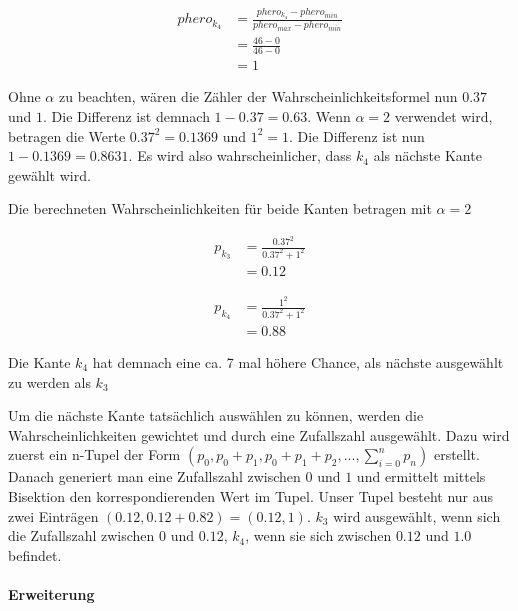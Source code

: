 \begin{equation*}
\begin{split}
phero_{k_4} & = \frac{phero_{k_4} - phero_{min}}{phero_{max} - phero_{min}} \\
            & = \frac{46 - 0}{46 - 0} \\
            & = 1
\end{split}
\end{equation*}

Ohne $\alpha$ zu beachten, wären die Zähler der Wahrscheinlichkeitsformel nun $0.37$ und $1$. Die Differenz ist demnach $1 - 0.37 = 0.63$. Wenn $\alpha = 2$ verwendet wird, betragen die Werte $0.37^2 = 0.1369$ und $1^2 = 1$. Die Differenz ist nun $1 - 0.1369 = 0.8631$. Es wird also wahrscheinlicher, dass $k_4$ als nächste Kante gewählt wird.

Die berechneten Wahrscheinlichkeiten für beide Kanten betragen mit $\alpha = 2$

\begin{equation*}
\begin{split}
p_{k_3} & = \frac{0.37^2}{0.37^2 + 1^2} \\
        & = 0.12
\end{split}
\end{equation*}

\begin{equation*}
\begin{split}
p_{k_4} & = \frac{1^2}{0.37^2 + 1^2} \\
        & = 0.88
\end{split}
\end{equation*}

Die Kante $k_4$ hat demnach eine ca. 7 mal höhere Chance, als nächste ausgewählt zu werden als $k_3$

Um die nächste Kante tatsächlich auswählen zu können, werden die Wahrscheinlichkeiten gewichtet und durch eine Zufallszahl ausgewählt. Dazu wird zuerst ein n-Tupel der Form $(p_0, p_0 + p_1, p_0 + p_1 + p_2, ..., \sum\nolimits_{i=0}^n p_n)$ erstellt. Danach generiert man eine Zufallszahl zwischen $0$ und $1$ und ermittelt mittels Bisektion den korrespondierenden Wert im Tupel. Unser Tupel besteht nur aus zwei Einträgen $(0.12, 0.12 + 0.82) = (0.12, 1)$. $k_3$ wird ausgewählt, wenn sich die Zufallszahl zwischen $0$ und $0.12$, $k_4$, wenn sie sich zwischen $0.12$ und $1.0$ befindet. 

\paragraph*{Erweiterung}

